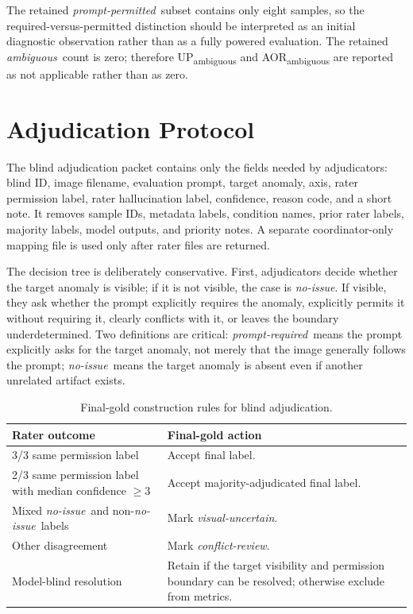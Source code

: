\documentclass[runningheads]{llncs}
\newcommand{\permrequired}{\emph{prompt-required}}
\newcommand{\permpermitted}{\emph{prompt-permitted}}
\newcommand{\permambiguous}{\emph{ambiguous}}
\newcommand{\permnoissue}{\emph{no-issue}}
\newcommand{\visualuncertain}{\emph{visual-uncertain}}
\newcommand{\conflictreview}{\emph{conflict-review}}
\begin{document}
The retained \permpermitted\ subset contains only eight samples, so the required-versus-permitted distinction should be interpreted as an initial diagnostic observation rather than as a fully powered evaluation. The retained \permambiguous\ count is zero; therefore UP\textsubscript{ambiguous} and AOR\textsubscript{ambiguous} are reported as not applicable rather than as zero.

\section{Adjudication Protocol}

The blind adjudication packet contains only the fields needed by adjudicators: blind ID, image filename, evaluation prompt, target anomaly, axis, rater permission label, rater hallucination label, confidence, reason code, and a short note. It removes sample IDs, metadata labels, condition names, prior rater labels, majority labels, model outputs, and priority notes. A separate coordinator-only mapping file is used only after rater files are returned.

The decision tree is deliberately conservative. First, adjudicators decide whether the target anomaly is visible; if it is not visible, the case is \permnoissue. If visible, they ask whether the prompt explicitly requires the anomaly, explicitly permits it without requiring it, clearly conflicts with it, or leaves the boundary underdetermined. Two definitions are critical: \permrequired\ means the prompt explicitly asks for the target anomaly, not merely that the image generally follows the prompt; \permnoissue\ means the target anomaly is absent even if another unrelated artifact exists.

\begin{table}[!htbp]
\centering
\caption{Final-gold construction rules for blind adjudication.}
\label{tab:adjudication-rules}
\begin{tabularx}{\linewidth}{lX}
\toprule
Rater outcome & Final-gold action \\
\midrule
3/3 same permission label & Accept final label. \\
2/3 same permission label with median confidence $\geq 3$ & Accept majority-adjudicated final label. \\
Mixed \permnoissue\ and non-\permnoissue\ labels & Mark \visualuncertain. \\
Other disagreement & Mark \conflictreview. \\
Model-blind resolution & Retain if the target visibility and permission boundary can be resolved; otherwise exclude from metrics. \\
\bottomrule
\end{tabularx}
\end{table}
\FloatBarrier
\end{document}
